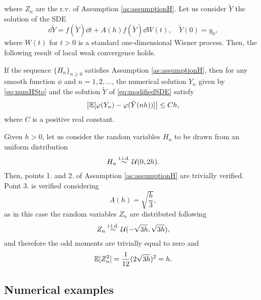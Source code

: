 \documentclass{scrartcl}
\begin{document}
where $Z_n$ are the r.v. of Assumption \ref{as:assumptionH}. Let us consider $\tilde Y$ the solution of the SDE
\begin{equation}\label{eq:modifiedSDE}
	\dd \tilde Y = f(\tilde Y) \dd t + A(h) f(\tilde Y) \dd W(t), \quad \tilde Y(0) = y_0,
\end{equation}
where $W(t)$ for $t > 0$ is a standard one-dimensional Wiener process. Then, the following result of local weak convergence holds.
\begin{theorem} If the sequence $\{H_n\}_{n\geq 0}$ satisfies Assumption \ref{as:assumptionH}, then for any smooth function $\phi$ and $n = 1, 2, \ldots$, the numerical solution $Y_n$ given by \eqref{eq:numHSto} and the solution $\tilde Y$ of \eqref{eq:modifiedSDE} satisfy 
\begin{equation}\label{eq:weakOrder}
	\abs{\mathbb{E}[\varphi(Y_n) - \varphi(\tilde Y(nh))]} \leq Ch,
\end{equation}
where $C$ is a positive real constant.
\end{theorem}
\begin{example}\label{ex:uniformH} Given $h > 0$, let us consider the random variables $H_n$ to be drawn from an uniform distribution 
	\begin{equation}
		H_n \stackrel{\text{i.i.d.}}{\sim} \mathcal{U}(0, 2h).
	\end{equation}
	Then, points 1. and 2. of Assumption \ref{as:assumptionH} are trivially verified. Point 3. is verified considering
	\begin{equation}
		A(h) = \sqrt{\frac{h}{3}},
	\end{equation} 
	as in this case the random variables $Z_n$ are distributed following
	\begin{equation}
		Z_n \stackrel{\text{i.i.d.}}{\sim} \mathcal{U}(-\sqrt{3h}, \sqrt{3h}),
	\end{equation}
	and therefore the odd moments are trivially equal to zero and
	\begin{equation}	
		\mathbb{E}[Z_n^2] = \frac{1}{12}(2\sqrt{3h})^2 = h. 
	\end{equation}
\end{example}

\subsection{Numerical examples}
\end{document}
